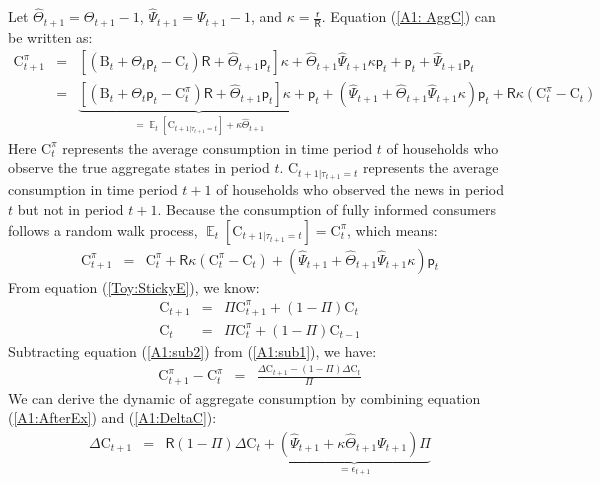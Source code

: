 \documentclass[12pt,letterpaper]{article}
\DeclareMathOperator{\E}{\mathbb{E}}
\begin{document}
Let $\hat{\Theta}_{t+1}=\Theta_{t+1}-1$, $\hat{\Psi}_{t+1}=\Psi_{t+1}-1$, and $\kappa=\frac{\mathsf{r}}{\mathsf{R}}$. Equation (\ref{A1: AggC}) can be written as:
\begin{eqnarray}
\mathrm{C}^{\pi}_{t+1} & = & \left[\left(\mathrm{B}_{t}+\Theta_{t}\mathsf{p}_{t}-\mathrm{C}_{t}\right)\mathsf{R}+\hat{\Theta}_{t+1}\mathsf{p}_{t}\right]\kappa+\hat{\Theta}_{t+1}\hat{\Psi}_{t+1}\kappa\mathsf{p}_{t}+\mathsf{p}_{t}+\hat{\Psi}_{t+1}\mathsf{p}_{t} \nonumber \\
& = & \underbrace{\left[\left(\mathrm{B}_{t}+\Theta_{t}\mathsf{p}_{t}-\mathrm{C}^{\pi}_{t}\right)\mathsf{R}+\hat{\Theta}_{t+1}\mathsf{p}_{t}\right]\kappa+\mathsf{p}_{t}}_{=\E_{t}[\mathrm{C}_{t+1|\tau_{t+1}=t}]+\kappa\hat{\Theta}_{t+1}}+\left(\hat{\Psi}_{t+1}+\hat{\Theta}_{t+1}\hat{\Psi}_{t+1}\kappa\right)\mathsf{p}_{t}+\mathsf{R}\kappa\left(\mathrm{C}^{\pi}_{t}-\mathrm{C}_{t}\right) \nonumber
\end{eqnarray}
Here $\mathrm{C}^{\pi}_{t}$ represents the average consumption in time period $t$ of households who observe the true aggregate states in period $t$. $\mathrm{C}_{t+1|\tau_{t+1}=t}$ represents the average consumption in time period $t+1$ of households who observed the news in period $t$ but not in period $t+1$. Because the consumption of fully informed consumers follows a random walk process, $\E_{t}[\mathrm{C}_{t+1|\tau_{t+1}=t}]=\mathrm{C}^{\pi}_{t}$, which means:
\begin{eqnarray} \label{A1:AfterEx}
\mathrm{C}^{\pi}_{t+1} & = & \mathrm{C}^{\pi}_{t}+\mathsf{R}\kappa\left(\mathrm{C}^{\pi}_{t}-\mathrm{C}_{t}\right)+\left(\hat{\Psi}_{t+1}+\hat{\Theta}_{t+1}\hat{\Psi}_{t+1}\kappa\right)\mathsf{p}_{t}
\end{eqnarray}
From equation (\ref{Toy:StickyE}), we know:
\begin{eqnarray}
\mathrm{C}_{t+1} & = & \Pi\mathrm{C}^{\pi}_{t+1}+\left(1-\Pi\right)\mathrm{C}_{t} \label{A1:sub1}\\
\mathrm{C}_{t} & = & \Pi\mathrm{C}^{\pi}_{t}+\left(1-\Pi\right)\mathrm{C}_{t-1}\label{A1:sub2}
\end{eqnarray}
Subtracting equation (\ref{A1:sub2}) from (\ref{A1:sub1}), we have:
\begin{eqnarray} \label{A1:DeltaC}
\mathrm{C}^{\pi}_{t+1}-\mathrm{C}^{\pi}_{t} & = & \frac{\Delta\mathrm{C}_{t+1}-\left(1-\Pi\right)\Delta\mathrm{C}_{t}}{\Pi}
\end{eqnarray}
We can derive the dynamic of aggregate consumption by combining equation (\ref{A1:AfterEx}) and (\ref{A1:DeltaC}):
\begin{eqnarray} \label{A1:Final}
\Delta\mathrm{C}_{t+1} & = & \mathsf{R}\left(1-\Pi\right)\Delta\mathrm{C}_{t}+\underbrace{\left(\hat{\Psi}_{t+1}+\kappa\hat{\Theta}_{t+1}\Psi_{t+1}\right)\Pi}_{=\epsilon_{t+1}}
\end{eqnarray}
\end{document}
